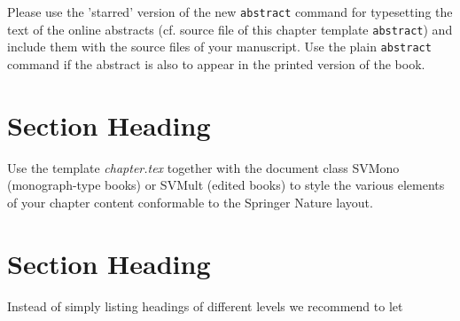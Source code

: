 Please use the 'starred' version of the new \texttt{abstract} command for typesetting the text of the online abstracts (cf. source file of this chapter template \texttt{abstract}) and include them with the source files of your manuscript. Use the plain \texttt{abstract} command if the abstract is also to appear in the printed version of the book.
\sloppy
{}

\section{Section Heading}
\label{sec:1}
Use the template \emph{chapter.tex} together with the document class SVMono (monograph-type books) or SVMult (edited books) to style the various elements of your chapter content conformable to the Springer Nature layout.

\section{Section Heading}
\label{sec:2}
Instead of simply listing headings of different levels we recommend to let 